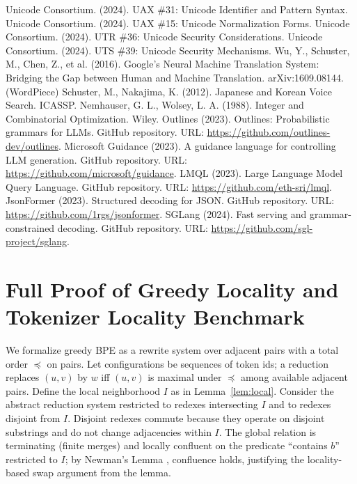 \documentclass{article}
\begin{document}
\begin{thebibliography}{99}
Unicode Consortium. (2024). UAX \#31: Unicode Identifier and Pattern Syntax.
Unicode Consortium. (2024). UAX \#15: Unicode Normalization Forms.
Unicode Consortium. (2024). UTR \#36: Unicode Security Considerations.
Unicode Consortium. (2024). UTS \#39: Unicode Security Mechanisms.
Wu, Y., Schuster, M., Chen, Z., et al. (2016). Google's Neural Machine Translation System: Bridging the Gap between Human and Machine Translation. arXiv:1609.08144. (WordPiece)
Schuster, M., Nakajima, K. (2012). Japanese and Korean Voice Search. ICASSP.
Nemhauser, G. L., Wolsey, L. A. (1988). Integer and Combinatorial Optimization. Wiley.
 Outlines (2023). Outlines: Probabilistic grammars for LLMs. GitHub repository. URL: \url{https://github.com/outlines-dev/outlines}.
 Microsoft Guidance (2023). A guidance language for controlling LLM generation. GitHub repository. URL: \url{https://github.com/microsoft/guidance}.
 LMQL (2023). Large Language Model Query Language. GitHub repository. URL: \url{https://github.com/eth-sri/lmql}.
 JsonFormer (2023). Structured decoding for JSON. GitHub repository. URL: \url{https://github.com/1rgs/jsonformer}.
 SGLang (2024). Fast serving and grammar-constrained decoding. GitHub repository. URL: \url{https://github.com/sgl-project/sglang}.
\end{thebibliography}

\appendix
\section{Full Proof of Greedy Locality and Tokenizer Locality Benchmark}\label{app:locality}
We formalize greedy BPE as a rewrite system over adjacent pairs with a total order $\preceq$ on pairs. Let configurations be sequences of token ids; a reduction replaces $(u,v)$ by $w$ iff $(u,v)$ is maximal under $\preceq$ among available adjacent pairs. Define the local neighborhood $I$ as in Lemma~\ref{lem:local}. Consider the abstract reduction system restricted to redexes intersecting $I$ and to redexes disjoint from $I$. Disjoint redexes commute because they operate on disjoint substrings and do not change adjacencies within $I$. The global relation is terminating (finite merges) and locally confluent on the predicate “contains $b$” restricted to $I$; by Newman's Lemma \cite{baader1998}, confluence holds, justifying the locality-based swap argument from the lemma.
\end{document}
